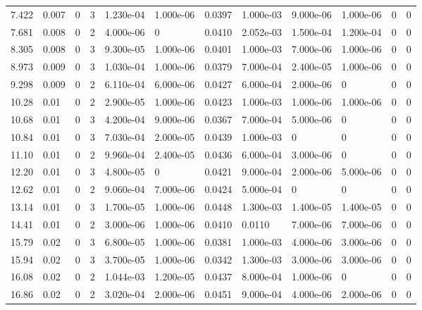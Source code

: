 \documentclass[preview]{standalone}
\begin{document}
{{\begin{tabular}{L{1.2cm}C{1.2cm} C{0.3cm}C{0.5cm} C{1.4cm}C{1.4cm} C{1.4cm}C{1.4cm} C{1.6cm}C{1.6cm} C{1.6cm}C{1.6cm}}
  7.422  &  0.007  & 0     &  3 &  1.230e-04  & 1.000e-06  &  0.0397&   1.000e-03& 9.000e-06 & 1.000e-06   &  0 & 0  \\ 
  7.681  &  0.008  & 0     &  2 &  4.000e-06  & 0  &  0.0410&   2.052e-03& 1.500e-04 & 1.200e-04   &  0 & 0  \\ 
  8.305  &  0.008  & 0     &  3 &  9.300e-05  & 1.000e-06  &  0.0401&   1.000e-03& 7.000e-06 & 1.000e-06   &  0 & 0  \\ 
  8.973  &  0.009  & 0     &  3 &  1.030e-04  & 1.000e-06  &  0.0379&   7.000e-04& 2.400e-05 & 1.000e-06   &  0 & 0  \\ 
  9.298  &  0.009  & 0     &  2 &  6.110e-04  & 6.000e-06  &  0.0427&   6.000e-04& 2.000e-06 & 0   &  0 & 0  \\ 
  10.28  &  0.01  & 0     &  2 &  2.900e-05  & 1.000e-06  &  0.0423&   1.000e-03& 1.000e-06 & 1.000e-06   &  0 & 0  \\ 
  10.68  &  0.01  & 0     &  3 &  4.200e-04  & 9.000e-06  &  0.0367&   7.000e-04& 5.000e-06 & 0   &  0 & 0  \\ 
  10.84  &  0.01  & 0     &  3 &  7.030e-04  & 2.000e-05  &  0.0439&   1.000e-03& 0 & 0   &  0 & 0  \\ 
  11.10  &  0.01  & 0     &  2 &  9.960e-04  & 2.400e-05  &  0.0436&   6.000e-04& 3.000e-06 & 0   &  0 & 0  \\ 
  12.20  &  0.01  & 0     &  3 &  4.800e-05  & 0  &  0.0421&   9.000e-04& 2.000e-06 & 5.000e-06   &  0 & 0  \\ 
  12.62  &  0.01  & 0     &  2 &  9.060e-04  & 7.000e-06  &  0.0424&   5.000e-04& 0 & 0   &  0 & 0  \\ 
  13.14  &  0.01  & 0     &  3 &  1.700e-05  & 1.000e-06  &  0.0448&   1.300e-03& 1.400e-05 & 1.400e-05   &  0 & 0  \\ 
  14.41  &  0.01  & 0     &  2 &  3.000e-06  & 1.000e-06  &  0.0410&   0.0110& 7.000e-06 & 7.000e-06   &  0 & 0  \\ 
  15.79  &  0.02  & 0     &  3 &  6.800e-05  & 1.000e-06  &  0.0381&   1.000e-03& 4.000e-06 & 3.000e-06   &  0 & 0  \\ 
  15.94  &  0.02  & 0     &  3 &  3.700e-05  & 1.000e-06  &  0.0342&   1.300e-03& 3.000e-06 & 3.000e-06   &  0 & 0  \\ 
  16.08  &  0.02  & 0     &  2 &  1.044e-03  & 1.200e-05  &  0.0437&   8.000e-04& 1.000e-06 & 0   &  0 & 0  \\ 
  16.86  &  0.02  & 0     &  2 &  3.020e-04  & 2.000e-06  &  0.0451&   9.000e-04& 4.000e-06 & 2.000e-06   &  0 & 0  \\ 

\end{tabular}}}
\end{document}
